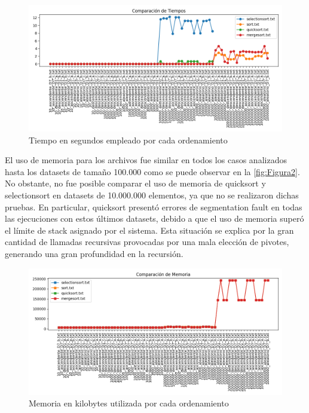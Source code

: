 \begin{figure}[H]
    \centering
    \includegraphics[width=\textwidth]{../code/sorting/data/plots/Grafico_tiempos.png}
    \caption{Tiempo en segundos empleado por cada ordenamiento}
    \label{fig:Figura1}
\end{figure}

\newpage
El uso de memoria para los archivos fue similar en todos los casos analizados hasta los datasets de tamaño 100.000 como se puede observar en la \autoref{fig:Figura2}. No obstante, no fue posible comparar el uso de memoria de quicksort y selectionsort en datasets de 10.000.000 elementos, ya que no se realizaron dichas pruebas. En particular, quicksort presentó errores de segmentation fault en todas las ejecuciones con estos últimos datasets, debido a que el uso de memoria superó el límite de stack asignado por el sistema. Esta situación se explica por la gran cantidad de llamadas recursivas provocadas por una mala elección de pivotes, generando una gran profundidad en la recursión.\\

\begin{figure}[H]
    \includegraphics[width=\textwidth]{../code/sorting/data/plots/Grafico_memoria.png}
    \caption{Memoria en kilobytes utilizada por cada ordenamiento}
    \label{fig:Figura2}
\end{figure}

